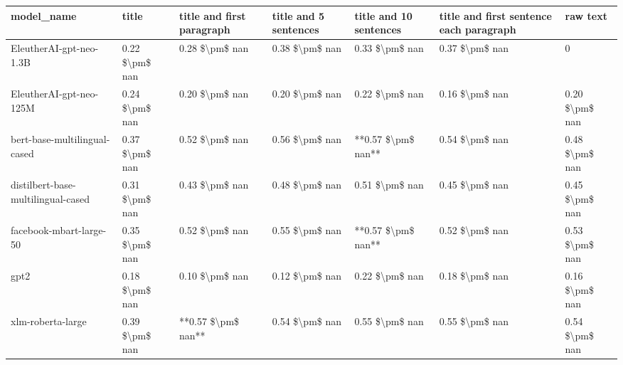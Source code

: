 \begin{tabular}{lllllll}
\toprule
                        model\_name &          title & title and first paragraph & title and 5 sentences & title and 10 sentences & title and first sentence each paragraph &       raw text \\
\midrule
           EleutherAI-gpt-neo-1.3B & 0.22 \$\textbackslash pm\$ nan &            0.28 \$\textbackslash pm\$ nan &        0.38 \$\textbackslash pm\$ nan &         0.33 \$\textbackslash pm\$ nan &                          0.37 \$\textbackslash pm\$ nan &              0 \\
           EleutherAI-gpt-neo-125M & 0.24 \$\textbackslash pm\$ nan &            0.20 \$\textbackslash pm\$ nan &        0.20 \$\textbackslash pm\$ nan &         0.22 \$\textbackslash pm\$ nan &                          0.16 \$\textbackslash pm\$ nan & 0.20 \$\textbackslash pm\$ nan \\
      bert-base-multilingual-cased & 0.37 \$\textbackslash pm\$ nan &            0.52 \$\textbackslash pm\$ nan &        0.56 \$\textbackslash pm\$ nan &     **0.57 \$\textbackslash pm\$ nan** &                          0.54 \$\textbackslash pm\$ nan & 0.48 \$\textbackslash pm\$ nan \\
distilbert-base-multilingual-cased & 0.31 \$\textbackslash pm\$ nan &            0.43 \$\textbackslash pm\$ nan &        0.48 \$\textbackslash pm\$ nan &         0.51 \$\textbackslash pm\$ nan &                          0.45 \$\textbackslash pm\$ nan & 0.45 \$\textbackslash pm\$ nan \\
           facebook-mbart-large-50 & 0.35 \$\textbackslash pm\$ nan &            0.52 \$\textbackslash pm\$ nan &        0.55 \$\textbackslash pm\$ nan &     **0.57 \$\textbackslash pm\$ nan** &                          0.52 \$\textbackslash pm\$ nan & 0.53 \$\textbackslash pm\$ nan \\
                              gpt2 & 0.18 \$\textbackslash pm\$ nan &            0.10 \$\textbackslash pm\$ nan &        0.12 \$\textbackslash pm\$ nan &         0.22 \$\textbackslash pm\$ nan &                          0.18 \$\textbackslash pm\$ nan & 0.16 \$\textbackslash pm\$ nan \\
                 xlm-roberta-large & 0.39 \$\textbackslash pm\$ nan &        **0.57 \$\textbackslash pm\$ nan** &        0.54 \$\textbackslash pm\$ nan &         0.55 \$\textbackslash pm\$ nan &                          0.55 \$\textbackslash pm\$ nan & 0.54 \$\textbackslash pm\$ nan \\
\bottomrule
\end{tabular}
